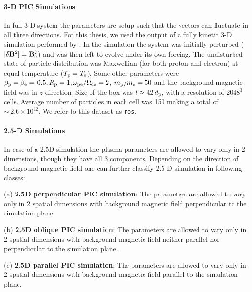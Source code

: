         \paragraph*{3-D PIC Simulations}\label{sec:3pic}

            In full 3-D system the parameters are setup such that the vectors can fluctuate in all
            three directions. For this thesis, we used the output of a fully kinetic 3-D simulation
            performed by \citep{Roytershteyn2015}. In the simulation the system was initially
            perturbed ($|\delta\mathbf{B}^2| = \mathbf{B}_{\rm 0}^2$) and was then left to evolve
            under its own forcing. The undisturbed state of particle distribution was Maxwellian
            (for both proton and electron) at equal temperature ($T_{\rm p} = T_{\rm e}$). Some
            other parameters were $\beta_{\rm p}=\beta_{\rm e}=\, 0.5, R_{\rm p}=1, \omega_{\rm
            pe}/\Omega_{\rm ce} = 2$, $m_{\rm p}/m_{\rm e} = 50$ and the background magnetic field
            was in $z$-direction. Size of the box was $l \approx 42\,d_{\rm p}$, with a resolution
            of $2048^3$ cells. Average number of particles in each cell was 150 making a total of
            $\sim\,2.6 \times 10^{12}$. We refer to this dataset as \texttt{ros}.

        \paragraph*{2.5-D Simulations}\label{sec:2pic}

            In case of a 2.5D simulation the plasma parameters are allowed to vary only in 2
            dimensions, though they have all 3 components. Depending on the direction of background
            magnetic field one can further classify 2.5-D simulation in following classes:

            (a) \textbf{2.5D perpendicular PIC simulation}: The parameters are allowed to vary only
            in 2 spatial dimensions with background magnetic field perpendicular to the simulation
            plane.

            (b) \textbf{2.5D oblique PIC simulation}: The parameters are allowed to vary only in 2
            spatial dimensions with background magnetic field neither parallel nor perpendicular to
            the simulation plane.

            (c) \textbf{2.5D parallel PIC simulation}: The parameters are allowed to vary only in 2
            spatial dimensions with background magnetic field parallel to the simulation plane.\\

